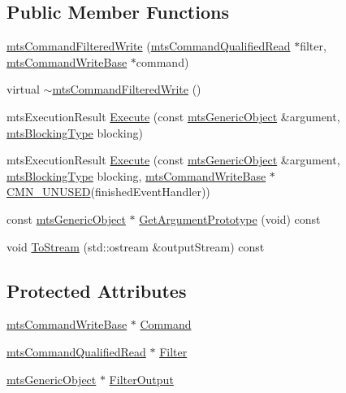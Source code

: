 \subsection*{Public Member Functions}
\begin{DoxyCompactItemize}
\item 
\hyperlink{classmts_command_filtered_write_a36beea3289b7379db2819fb5aea65b9a}{mts\+Command\+Filtered\+Write} (\hyperlink{classmts_command_qualified_read}{mts\+Command\+Qualified\+Read} $\ast$filter, \hyperlink{classmts_command_write_base}{mts\+Command\+Write\+Base} $\ast$command)
\item 
virtual \hyperlink{classmts_command_filtered_write_ae133dcf12e2d87d66149ed366ea0127c}{$\sim$mts\+Command\+Filtered\+Write} ()
\item 
mts\+Execution\+Result \hyperlink{classmts_command_filtered_write_a6324b444c5b118399e3c4b1b3c3cc8dd}{Execute} (const \hyperlink{classmts_generic_object}{mts\+Generic\+Object} \&argument, \hyperlink{mts_forward_declarations_8h_ad7426ccb6c883bc780d0ee197dddcbe7}{mts\+Blocking\+Type} blocking)
\item 
mts\+Execution\+Result \hyperlink{classmts_command_filtered_write_adad546b19cb146481df6f46aef804478}{Execute} (const \hyperlink{classmts_generic_object}{mts\+Generic\+Object} \&argument, \hyperlink{mts_forward_declarations_8h_ad7426ccb6c883bc780d0ee197dddcbe7}{mts\+Blocking\+Type} blocking, \hyperlink{classmts_command_write_base}{mts\+Command\+Write\+Base} $\ast$\hyperlink{cmn_portability_8h_a021894e2626935fa2305434b1e893ff6}{C\+M\+N\+\_\+\+U\+N\+U\+S\+E\+D}(finished\+Event\+Handler))
\item 
const \hyperlink{classmts_generic_object}{mts\+Generic\+Object} $\ast$ \hyperlink{classmts_command_filtered_write_a5bd6b23d95778ef83e4ae4cc0df857fa}{Get\+Argument\+Prototype} (void) const 
\item 
void \hyperlink{classmts_command_filtered_write_a286a6a1e8963a593db2a984914faa1f7}{To\+Stream} (std\+::ostream \&output\+Stream) const 
\end{DoxyCompactItemize}
\subsection*{Protected Attributes}
\begin{DoxyCompactItemize}
\item 
\hyperlink{classmts_command_write_base}{mts\+Command\+Write\+Base} $\ast$ \hyperlink{classmts_command_filtered_write_a58cf3073e6fbdf0874d8aa369d3500cd}{Command}
\item 
\hyperlink{classmts_command_qualified_read}{mts\+Command\+Qualified\+Read} $\ast$ \hyperlink{classmts_command_filtered_write_afbf763a5226ddc747f8dd25219b2e027}{Filter}
\item 
\hyperlink{classmts_generic_object}{mts\+Generic\+Object} $\ast$ \hyperlink{classmts_command_filtered_write_a87da9e319a6eb2fe6f4ca23efbf59bce}{Filter\+Output}
\end{DoxyCompactItemize}
